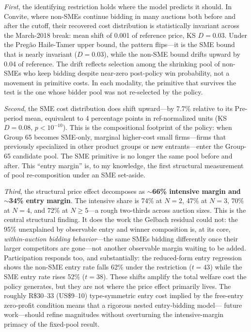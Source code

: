 \documentclass[12pt]{article}
\begin{document}
\emph{First}, the identifying restriction holds where the model
predicts it should. In Convite, where non-SMEs continue bidding in
many auctions both before and after the cutoff, their recovered cost
distribution is statistically invariant across the March-2018 break:
mean shift of 0.001 of reference price, KS $D = 0.03$. Under the
Preg\~ao Haile-Tamer upper bound, the pattern flips---it is the SME
bound that is nearly invariant ($D = 0.03$), while the non-SME bound
drifts upward by 0.04 of reference. The drift reflects selection among
the shrinking pool of non-SMEs who keep bidding despite near-zero
post-policy win probability, not a movement in primitive costs. In
each modality, the primitive that survives the test is the one whose
bidder pool was not re-selected by the policy.

\emph{Second}, the SME cost distribution does shift upward---by 7.7\%
relative to its Pre-period mean, equivalent to 4 percentage points
in ref-normalized units (KS $D = 0.08$, $p < 10^{-10}$). This is the
compositional footprint of the policy: when Group 65 becomes
SME-only, marginal higher-cost small firms---firms that previously
specialized in other product groups or new entrants---enter the
Group-65 candidate pool. The SME primitive is no longer the same pool
before and after. This ``entry margin'' is, to my knowledge, the first
structural measurement of pool re-composition under an SME set-aside.

\emph{Third}, the structural price effect decomposes as
\textbf{$\sim$66\% intensive margin and $\sim$34\% entry margin}.
The intensive share is 74\% at $N{=}2$, 47\% at $N{=}3$, 70\% at
$N{=}4$, and 72\% at $N{\geq}5$---a rough two-thirds across auction
sizes. This is the central structural finding. It does the work
the Gelbach residual could not: the 95\% unexplained by observable
entry and winner composition is, at its core, \emph{within-auction
bidding behavior}---the same SMEs bidding differently once their
larger competitors are gone---not another observable margin waiting
to be added. Participation responds too, and substantially: the
reduced-form entry regression shows the non-SME entry rate falls
62\% under the restriction ($t = 43$) while the SME entry rate
rises 52\% ($t = 38$). These shifts amplify the total welfare cost
the policy generates, but they are not where the price effect
primarily lives. The roughly R\$30--33 (US\$9--10) type-symmetric
entry cost implied by the free-entry zero-profit condition means
that a
rigorous \citet{atheyseira2011} nested entry-bidding model---
future work---should refine magnitudes without overturning the
intensive-margin primacy of the fixed-pool result.
\end{document}
